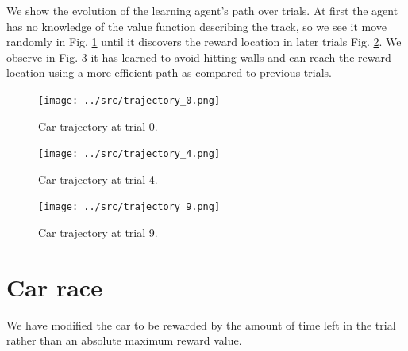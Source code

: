 We show the evolution of the learning agent's path over trials. At first the agent has no knowledge of the value function describing the track, so we see it move randomly in Fig. \ref{fig:trial0} until it discovers the reward location in later trials Fig. \ref{fig:trial4}. We observe in Fig. \ref{fig:trial9} it has learned to avoid hitting walls and can reach the reward location using a more efficient path as compared to previous trials. 

\begin{figure}[h!]
\centering
\texttt{[image: ../src/trajectory\_0.png]}
\caption{Car trajectory at trial 0. \label{fig:trial0}}
\end{figure}


\begin{figure}[h!]
\centering
\texttt{[image: ../src/trajectory\_4.png]}
\caption{Car trajectory at trial 4. \label{fig:trial4}}
\end{figure}

\begin{figure}[h!]
\centering
\texttt{[image: ../src/trajectory\_9.png]}
\caption{Car trajectory at trial 9. \label{fig:trial9}}
\end{figure}

\section{Car race}
We have modified the car to be rewarded by the amount of time left in the trial rather than an absolute maximum reward value. 

